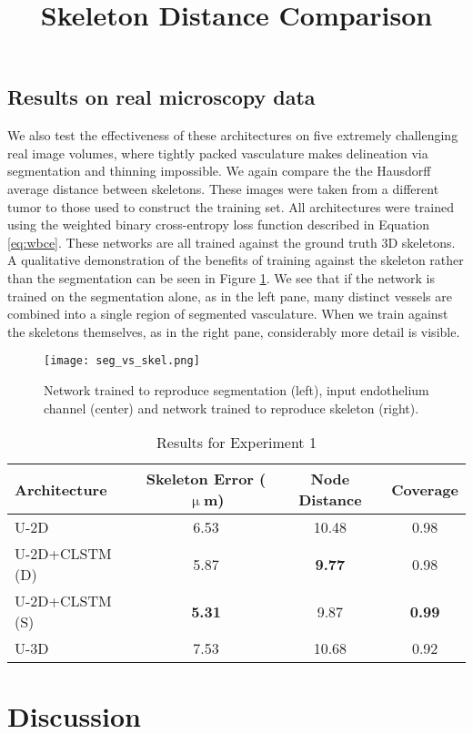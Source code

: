\documentclass[journal,transmag]{IEEEtran}
\begin{document}
\subsection{Results on real microscopy data}

We also test the effectiveness of these architectures on five extremely challenging real image volumes, where tightly packed vasculature makes delineation via segmentation and thinning impossible. We again compare the the Hausdorff average distance between skeletons. These images were taken from a different tumor to those used to construct the training set. All architectures were trained using the weighted binary cross-entropy loss function described in Equation \ref{eq:wbce}. These networks are all trained against the ground truth 3D skeletons. A qualitative demonstration of the benefits of training against the skeleton rather than the segmentation can be seen in Figure \ref{fig:seg_skel_compare}. We see that if the network is trained on the segmentation alone, as in the left pane, many distinct vessels are combined into a single region of segmented vasculature. When we train against the skeletons themselves, as in the right pane, considerably more detail is visible. 

\begin{figure}
\centering
\texttt{[image: seg\_vs\_skel.png]}
\caption{Network trained to reproduce segmentation (left), input endothelium channel (center) and network trained to reproduce skeleton (right).}
\label{fig:seg_skel_compare}
\end{figure}


\begin{table}[h]
\title{Skeleton Distance Comparison}
\centering
\begin{tabular}{l|c|c|c}
Architecture & Skeleton Error ($\upmu$m) & Node Distance & Coverage\\ 
\hline
U-2D & 6.53 & 10.48 & 0.98 \\
U-2D+CLSTM (D) & 5.87 & \textbf{9.77} & 0.98 \\
U-2D+CLSTM (S) & \textbf{5.31} & 9.87 & \textbf{0.99} \\
U-3D &  7.53 & 10.68 &  0.92 \\
\end{tabular}
\caption{Results for Experiment 1}
\end{table}



\section{Discussion}
\end{document}
